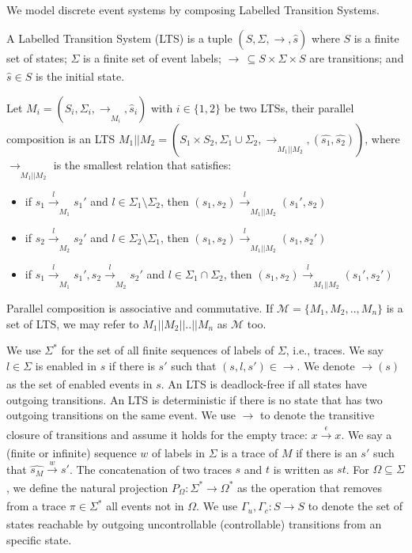 We model discrete event systems by composing Labelled Transition Systems.%
\begin{definition}
    A Labelled Transition System (LTS) is a tuple $(S, \Sigma, \xrightarrow[]{}, \hat{s})$ where $S$ is a finite set of states; $\Sigma$ is a finite set of event labels; $\xrightarrow[]{} \, \subseteq S \times \Sigma \times S$ are transitions; and $\hat{s} \in S$ is the initial state.
\end{definition}
 


\begin{definition}
    Let $M_i = (S_i, \Sigma_i, \xrightarrow[]{}_{M_i}, \hat{s}_i)$ with $i\in \{1,2\}$ be two LTSs, their parallel composition is an LTS  $M_1 || M_2 = (S_{1}  \times S_{2}, \Sigma_{1} \cup \Sigma_{2}, \xrightarrow[]{}_{M_1||M_2}, (\hat{s_1}, \hat{s_2}))$, where $\xrightarrow[]{}_{M_1||M_2}$ is the smallest relation that satisfies:
   \begin{itemize}
        \item if $s_1 \xrightarrow[]{l}_{M_1} s_1'$ and $l \in \Sigma_{1} \setminus \Sigma_{2}$, then $(s_1, s_2) \xrightarrow[]{l}_{M_1||M_2} (s_1', s_2)$
        \item if $s_2 \xrightarrow[]{l}_{M_2} s_2'$ and $l \in \Sigma_{2} \setminus \Sigma_{1}$, then $(s_1, s_2) \xrightarrow[]{l}_{M_1||M_2} (s_1, s_2')$
        \item  if $s_1 \xrightarrow[]{l}_{M_1} s_1', s_2 \xrightarrow[]{l}_{M_2} s_2'$ and $l \in \Sigma_{1} \cap \Sigma_{2}$, then $(s_1, s_2) \xrightarrow[]{l}_{M_1||M_2} (s_1', s_2')$
   \end{itemize}
\end{definition}
Parallel composition is associative and commutative. If $\mathcal{M} = \{M_1, M_2, .., M_n\}$ is a set of LTS, we may refer to $M_1 || M_2 || .. ||M_n$ as $\mathcal{M}$ too.


We use $\Sigma^{*}$ for the set of all finite sequences of labels of $\Sigma$, i.e., traces. We say $l \in \Sigma$ is enabled in $s$ if there is $s'$ such that $(s, l, s') \in  \xrightarrow[]{} $. We denote $\xrightarrow[]{}\!(s)$ as the set of enabled events in $s$. An LTS is deadlock-free if all states have outgoing transitions. An LTS is deterministic if there is no state that has two outgoing  transitions on the same event. We use $\xrightarrow[]{}$ to denote the transitive closure of transitions and assume it holds for the empty trace:  $x \xrightarrow[]{\epsilon} x$. We say a (finite or infinite) sequence $w$ of labels in $\Sigma$ is a trace of $M$ if there is an $s'$ such that $\hat{s_M} \xrightarrow[]{w} s'$. 
The concatenation of two traces $s$ and $t$ is written as $st$. For $\Omega \subseteq \Sigma$, we define the natural projection $P_{\Omega}: \Sigma^{*} \xrightarrow[]{} \Omega^{*}$ as the operation that removes from a trace $\pi \in \Sigma^{*}$ all events not in $\Omega$. We use $\Gamma_u, \Gamma_c: S \xrightarrow[]{} S$ to denote the set of states reachable by outgoing uncontrollable (controllable) transitions from an specific state.


